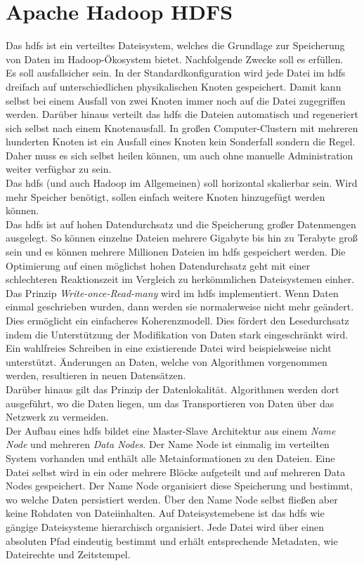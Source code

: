 \section{Apache Hadoop HDFS}
\label{sec:theory_hdfs}
Das \acrfull{hdfs} ist ein verteiltes Dateisystem, welches die Grundlage zur Speicherung von Daten im Hadoop-Ökosystem bietet. Nachfolgende Zwecke soll es erfüllen.\\
Es soll ausfallsicher sein. In der Standardkonfiguration wird jede Datei im \gls{hdfs} dreifach auf unterschiedlichen physikalischen Knoten gespeichert. Damit kann selbst bei einem Ausfall von zwei Knoten immer noch auf die Datei zugegriffen werden. Darüber hinaus verteilt das \gls{hdfs} die Dateien automatisch und regeneriert sich selbst nach einem Knotenausfall. In großen Computer-Clustern mit mehreren hunderten Knoten ist ein Ausfall eines Knoten kein Sonderfall sondern die Regel. Daher muss es sich selbst heilen können, um auch ohne manuelle Administration weiter verfügbar zu sein.\\
Das \gls{hdfs} (und auch Hadoop im Allgemeinen) soll horizontal skalierbar sein. Wird mehr Speicher benötigt, sollen einfach weitere Knoten hinzugefügt werden können.\\
Das \gls{hdfs} ist auf hohen Datendurchsatz und die Speicherung großer Datenmengen ausgelegt.
So können einzelne Dateien mehrere Gigabyte bis hin zu Terabyte groß sein und es können mehrere Millionen Dateien im \gls{hdfs} gespeichert werden. Die Optimierung auf einen möglichst hohen Datendurchsatz geht mit einer schlechteren Reaktionszeit im Vergleich zu herkömmlichen Dateisystemen einher.\\
Das Prinzip \textit{Write-once-Read-many} wird im \gls{hdfs} implementiert. Wenn Daten einmal geschrieben wurden, dann werden sie normalerweise nicht mehr geändert. Dies ermöglicht ein einfacheres Koherenzmodell. Dies fördert den Lesedurchsatz indem die Unterstützung der Modifikation von Daten stark eingeschränkt wird. Ein wahlfreies Schreiben in eine existierende Datei wird beispielsweise nicht unterstützt. Änderungen an Daten, welche von Algorithmen vorgenommen werden, resultieren in neuen Datensätzen.\\
Darüber hinaus gilt das Prinzip der Datenlokalität. Algorithmen werden dort ausgeführt, wo die Daten liegen, um das Transportieren von Daten über das Netzwerk zu vermeiden.\cite{hdfs_architecture}\\

\noindent
Der Aufbau eines \gls{hdfs} bildet eine Master-Slave Architektur aus einem \textit{Name Node} und mehreren \textit{Data Nodes}. Der Name Node ist einmalig im verteilten System vorhanden und enthält alle Metainformationen zu den Dateien. Eine Datei selbst wird in ein oder mehrere Blöcke aufgeteilt und auf mehreren Data Nodes gespeichert. Der Name Node organisiert diese Speicherung und bestimmt, wo welche Daten persistiert werden. Über den Name Node selbst fließen aber keine Rohdaten von Dateiinhalten. Auf Dateisystemebene ist das \gls{hdfs} wie gängige Dateisysteme hierarchisch organisiert. Jede Datei wird über einen absoluten Pfad eindeutig bestimmt und erhält entsprechende Metadaten, wie Dateirechte und Zeitstempel.  \\

